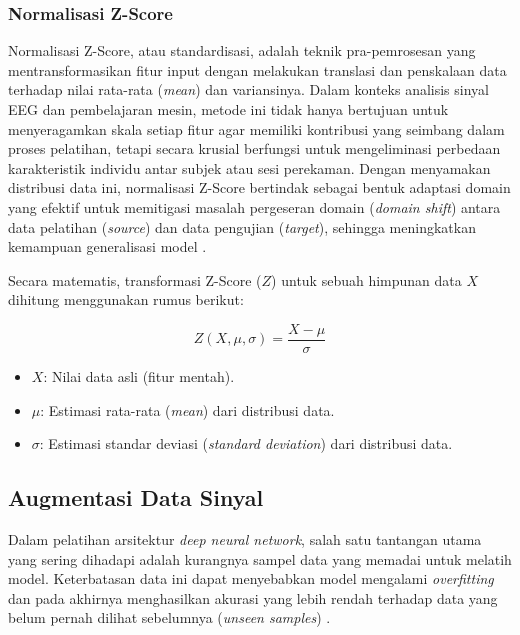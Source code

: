 \subsubsection{Normalisasi Z-Score}
Normalisasi Z-Score, atau standardisasi, adalah teknik pra-pemrosesan yang mentransformasikan fitur input dengan melakukan translasi dan penskalaan data terhadap nilai rata-rata (\textit{mean}) dan variansinya. Dalam konteks analisis sinyal EEG dan pembelajaran mesin, metode ini tidak hanya bertujuan untuk menyeragamkan skala setiap fitur agar memiliki kontribusi yang seimbang dalam proses pelatihan, tetapi secara krusial berfungsi untuk mengeliminasi perbedaan karakteristik individu antar subjek atau sesi perekaman. Dengan menyamakan distribusi data ini, normalisasi Z-Score bertindak sebagai bentuk adaptasi domain yang efektif untuk memitigasi masalah pergeseran domain (\textit{domain shift}) antara data pelatihan (\textit{source}) dan data pengujian (\textit{target}), sehingga meningkatkan kemampuan generalisasi model \cite{roy2023}.

Secara matematis, transformasi Z-Score ($Z$) untuk sebuah himpunan data $X$ dihitung menggunakan rumus berikut:

\begin{equation}
    Z(X, \mu, \sigma) = \frac{X - \mu}{\sigma}
\end{equation}

\begin{itemize}
    \item $X$: Nilai data asli (fitur mentah).
    \item $\mu$: Estimasi rata-rata (\textit{mean}) dari distribusi data.
    \item $\sigma$: Estimasi standar deviasi (\textit{standard deviation}) dari distribusi data.
\end{itemize}

\subsection{Augmentasi Data Sinyal} \label{II.Teori1}
Dalam pelatihan arsitektur \textit{deep neural network}, salah satu tantangan utama yang sering dihadapi adalah kurangnya sampel data yang memadai untuk melatih model. Keterbatasan data ini dapat menyebabkan model mengalami \textit{overfitting} dan pada akhirnya menghasilkan akurasi yang lebih rendah terhadap data yang belum pernah dilihat sebelumnya (\textit{unseen samples}) \cite{akyash2021dtw}. 

